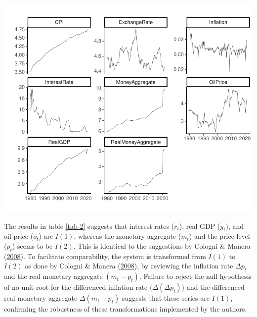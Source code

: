 \documentclass[11pt,preprint, authoryear]{elsarticle}
\let\origfigure\figure
\let\endorigfigure\endfigure
\renewenvironment{figure}[1][2] {
    \expandafter\origfigure\expandafter[H]
} {
    \endorigfigure
}
\numberwithin{equation}{section}
\numberwithin{figure}{section}
\numberwithin{table}{section}
\begin{document}
\begin{figure}
\centering
\includegraphics{Time_Series_Proj_Data_files/figure-latex/unnamed-chunk-1-1.pdf}
\caption{Time Series of the Macroeconomic Variables
(Log-Transformed).\label{fig1}}
\end{figure}

The results in table \ref{tab-2} suggests that interest rates (\(r_t\)),
real GDP (\(y_t\)), and oil price (\(o_t\)) are \(I(1)\), whereas the
monetary aggregate (\(m_t\)) and the price level (\(p_t\)) seems to be
\(I(2)\). This is identical to the suggestions by Cologni \& Manera
(\protect\hyperlink{ref-cologni2008}{2008}). To facilitate
comparability, the system is transformed from \(I(1)\) to \(I(2)\) as
done by Cologni \& Manera (\protect\hyperlink{ref-cologni2008}{2008}),
by reviewing the inflation rate \(\varDelta p_t\) and the real monetary
aggregate \((m_t-p_t)\). Failure to reject the null hypothesis of no
unit root for the differenced inflation rate
(\(\varDelta(\varDelta p_t)\)) and the differenced real monetary
aggregate \(\varDelta(m_t -p_t)\) suggests that these series are
\(I(1)\), confirming the robustness of these transformations implemented
by the authors.
\end{document}

